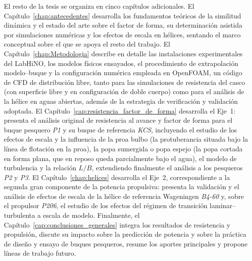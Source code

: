 El resto de la tesis se organiza en cinco capítulos adicionales. El
Capítulo~\ref{chap:antecedentes} desarrolla los fundamentos teóricos de la
similitud dinámica y el estado del arte sobre el factor de forma, su
determinación asistida por simulaciones numéricas y los efectos de escala en
hélices, sentando el marco conceptual sobre el que se apoya el resto del
trabajo. El Capítulo~\ref{chap:Metodologia} describe en detalle las
instalaciones experimentales del LabHiNO, los modelos físicos ensayados, el
procedimiento de extrapolación modelo--buque y la configuración numérica
empleada en OpenFOAM, un código de CFD de distribución libre, tanto para las
simulaciones de resistencia del casco
(con superficie libre y en configuración de doble cuerpo) como para el
análisis de la hélice en aguas abiertas, además de la estrategia de
verificación y validación adoptada. El
Capítulo~\ref{cap:resistencia_factor_de_forma} desarrolla el Eje~1:
presenta el análisis original de resistencia al avance y factor de forma para el buque pesquero \textit{P1} y su
buque de referencia \textit{KCS}, incluyendo el estudio de los efectos de escala y la
influencia de la proa bulbo (la protuberancia situada bajo la línea de
flotación en la proa), la popa sumergida o popa espejo (la popa cortada en
forma plana, que en reposo queda parcialmente bajo el agua), el modelo de
turbulencia y la relación $L/B$, extendiendo finalmente el análisis a los pesqueros \textit{P2} y \textit{P3}. El
Capítulo~\ref{chap:helices} desarrolla el Eje~2, correspondiente a la
segunda gran componente de la potencia propulsiva: presenta la validación y el análisis de efectos de escala de la
hélice de referencia Wageningen \textit{B4-60} y, sobre el propulsor \textit{P206}, el estudio
de los efectos del régimen de transición laminar--turbulenta
a escala de modelo. Finalmente, el Capítulo~\ref{cap:conclusiones_generales}
integra los resultados de resistencia y propulsión, discute su impacto sobre
la predicción de potencia y sobre la práctica de diseño y ensayo de buques
pesqueros, resume los aportes principales y propone líneas de trabajo futuro.